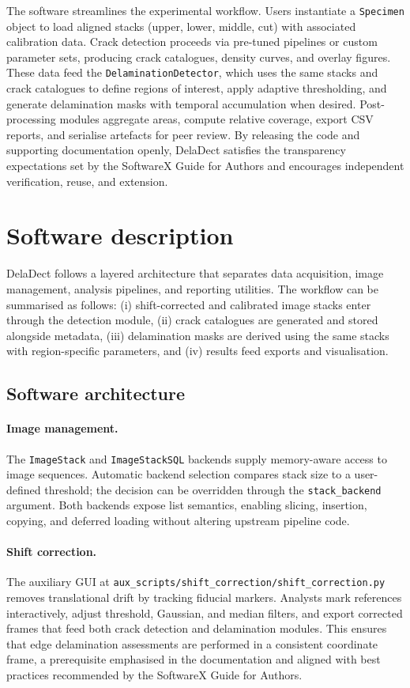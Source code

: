 \documentclass[preprint,12pt,a4paper]{elsarticle}
\begin{document}
The software streamlines the experimental workflow. Users instantiate a \texttt{Specimen} object to load
aligned stacks (upper, lower, middle, cut) with associated calibration data. Crack detection proceeds via
pre-tuned pipelines or custom parameter sets, producing crack catalogues, density curves, and overlay
figures. These data feed the \texttt{DelaminationDetector}, which uses the same stacks and crack
catalogues to define regions of interest, apply adaptive thresholding, and generate delamination masks
with temporal accumulation when desired. Post-processing modules aggregate areas, compute relative
coverage, export CSV reports, and serialise artefacts for peer review. By releasing the code and
supporting documentation openly, DelaDect satisfies the transparency expectations set by the SoftwareX
Guide for Authors and encourages independent verification, reuse, and extension.

\section{Software description}
DelaDect follows a layered architecture that separates data acquisition, image management, analysis
pipelines, and reporting utilities. The workflow can be summarised as follows: (i) shift-corrected and
calibrated image stacks enter through the detection module, (ii) crack catalogues are generated and
stored alongside metadata, (iii) delamination masks are derived using the same stacks with region-specific
parameters, and (iv) results feed exports and visualisation.

\subsection{Software architecture}
\paragraph{Image management.} The \texttt{ImageStack} and \texttt{ImageStackSQL} backends supply
memory-aware access to image sequences. Automatic backend selection compares stack size to a user-defined
threshold; the decision can be overridden through the \texttt{stack\_backend} argument. Both backends
expose list semantics, enabling slicing, insertion, copying, and deferred loading without altering
upstream pipeline code.

\paragraph{Shift correction.} The auxiliary GUI at
\texttt{aux\_scripts/shift\_correction/shift\_correction.py} removes translational drift by tracking
fiducial markers. Analysts mark references interactively, adjust threshold, Gaussian, and median filters,
and export corrected frames that feed both crack detection and delamination modules. This ensures that
edge delamination assessments are performed in a consistent coordinate frame, a prerequisite emphasised
in the documentation and aligned with best practices recommended by the SoftwareX Guide for Authors.
\end{document}
